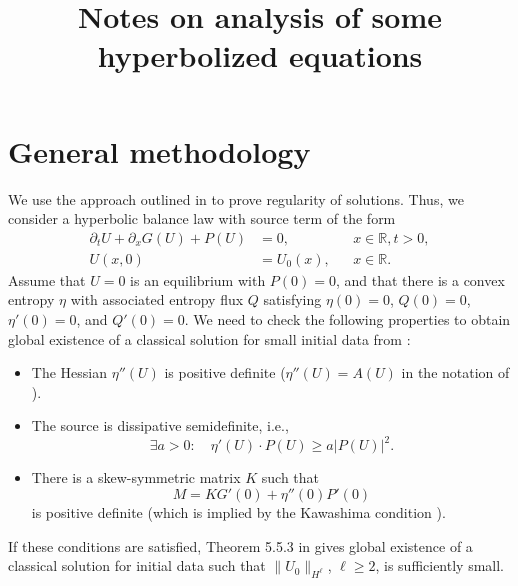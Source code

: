 \documentclass{article}
\title{Notes on analysis of some hyperbolized equations}
\theoremstyle{plain}
\theoremstyle{definition}
\numberwithin{theorem}{section}
\begin{document}
\maketitle

\section{General methodology} \label{sec:general}
We use the approach outlined in \cite[Section~5.5]{dafermos2016hyperbolic} to prove regularity of solutions.
Thus, we consider a hyperbolic balance law with source term of the form
\begin{equation}
\begin{aligned}
    \partial_t U + \partial_x G(U) + P(U) &= 0, && x \in \mathbb{R}, t > 0, \\
    U(x, 0) & = U_0(x), && x \in \mathbb{R}.
\end{aligned}
\end{equation}
Assume that $U = 0$ is an equilibrium with $P(0) = 0$, and that there is a convex entropy $\eta$ with associated entropy flux $Q$ satisfying $\eta(0) = 0$, $Q(0) = 0$, $\eta'(0) = 0$, and $Q'(0) = 0$.
We need to check the following properties to obtain global existence of a classical solution for small initial data from \cite[Theorem~5.5.3]{dafermos2016hyperbolic}:
\begin{itemize}
    \item The Hessian $\eta''(U)$ is positive definite ($\eta''(U) = A(U)$ in the notation of \cite[Section~5.5]{dafermos2016hyperbolic}).
    \item The source is dissipative semidefinite, i.e.,
          \begin{equation}
          \label{eq:dissipative_semidefinite}
            \exists a > 0\colon \quad
            \eta'(U) \cdot P(U) \ge a |P(U)|^2.
          \end{equation}
    \item There is a skew-symmetric matrix $K$ such that
          \begin{equation} \label{eq:M}
            M = K G'(0) + \eta''(0) P'(0)
          \end{equation}
          is positive definite (which is implied by the Kawashima
          condition \cite[Section~5.2]{dafermos2016hyperbolic}).
\end{itemize}
If these conditions are satisfied, Theorem 5.5.3 in
\cite[Theorem~5.5.3]{dafermos2016hyperbolic}
gives global existence of a classical solution for initial data
such that $\|U_0\|_{H^\ell}$, $\ell \ge 2$, is sufficiently small.
\end{document}
